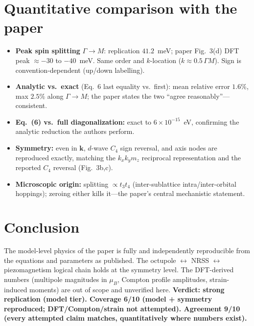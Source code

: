 \documentclass[11pt]{article}
\begin{document}
\section{Quantitative comparison with the paper}
\begin{itemize}
\item \textbf{Peak spin splitting} $\Gamma\!\to\!M$: replication $41.2$~meV;
paper Fig.~3(d) DFT peak $\approx-30$ to $-40$~meV. Same order and $k$-location
($k\approx0.5\,\Gamma M$). Sign is convention-dependent (up/down labelling).
\item \textbf{Analytic vs.\ exact} (Eq.~6 last equality vs.\ first): mean
relative error $1.6\%$, max $2.5\%$ along $\Gamma\!\to\!M$; the paper states the
two ``agree reasonably''---consistent.
\item \textbf{Eq.~(6) vs.\ full diagonalization:} exact to $6\times10^{-15}$~eV,
confirming the analytic reduction the authors perform.
\item \textbf{Symmetry:} even in $\mathbf{k}$, $d$-wave $C_4$ sign reversal, and
axis nodes are reproduced exactly, matching the $k_xk_y m_z$ reciprocal
representation and the reported $C_4$ reversal (Fig.~3b,c).
\item \textbf{Microscopic origin:} splitting $\propto t_3 t_4$ (inter-sublattice
intra/inter-orbital hoppings); zeroing either kills it---the paper's central
mechanistic statement.
\end{itemize}

\section{Conclusion}
The model-level physics of the paper is fully and independently reproducible from
the equations and parameters as published. The octupole $\leftrightarrow$ NRSS
$\leftrightarrow$ piezomagnetism logical chain holds at the symmetry level. The
DFT-derived numbers (multipole magnitudes in $\mu_B$, Compton profile
amplitudes, strain-induced moments) are out of scope and unverified here.
\textbf{Verdict: strong replication (model tier). Coverage 6/10
(model + symmetry reproduced; DFT/Compton/strain not attempted).
Agreement 9/10 (every attempted claim matches, quantitatively where numbers
exist).}
\end{document}
